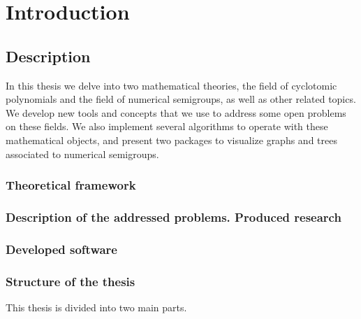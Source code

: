 

\part{Introduction}

\chapter{Description} \label{sec:intro}

In this thesis we delve into two mathematical theories, the field of cyclotomic polynomials and the field of numerical semigroups, as well as other related topics. We develop new tools and concepts that we use to address some open problems on these fields. We also implement several algorithms to operate with these mathematical objects, and present two packages to visualize graphs and trees associated to numerical semigroups.

\section{Theoretical framework}
\section{Description of the addressed problems. Produced research}


\section{Developed software}


\section{Structure of the thesis}

This thesis is divided into two main parts.

